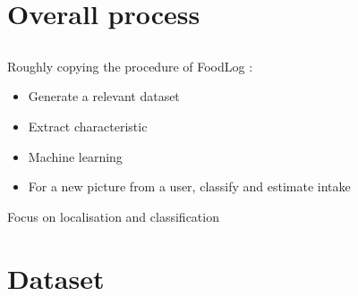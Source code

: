 \documentclass[aspectratio=169]{beamer}
\let\oldsection\section
\renewcommand{\section}[1]{
    \oldsection{#1}	
    \subsection{}
}
\newenvironment{myframe}[1][t]{\begin{frame}[#1]{\secname}{\subsecname}}{\end{frame}}
\begin{document}
     \section{Overall process}
     
     \begin{myframe}[c]
         Roughly copying the procedure of FoodLog \cite{Kitamura2009, Kitamura2008, DeSilva2011, Aizawa2013, Kagaya2014}:
         \begin{itemize}
             \item Generate a relevant dataset
             \item Extract characteristic
             \item Machine learning
             \item For a new picture from a user, classify and estimate intake
         \end{itemize}
         \vspace{0.5cm}
         Focus on localisation and classification
     \end{myframe}
    
%                
%                

    \section{Dataset}
    
\end{document}
